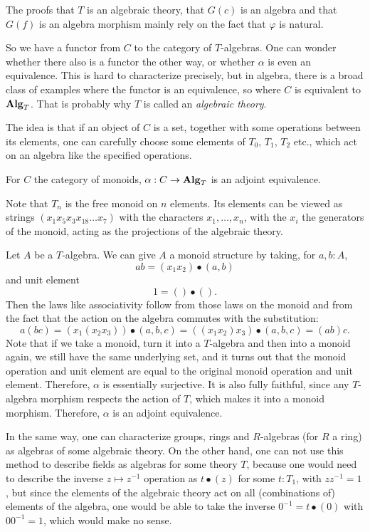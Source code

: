 The proofs that $ T $ is an algebraic theory, that $ G(c) $ is an algebra and that $ G(f) $ is an algebra morphism mainly rely on the fact that $ \varphi $ is natural.

So we have a functor from $ C $ to the category of $ T $-algebras. One can wonder whether there also is a functor the other way, or whether $ \alpha $ is even an equivalence. This is hard to characterize precisely, but in algebra, there is a broad class of examples where the functor is an equivalence, so where $ C $ is equivalent to $ \mathbf{Alg}_{T} $. That is probably why $ T $ is called an \textit{algebraic theory}.

The idea is that if an object of $ C $ is a set, together with some operations between its elements, one can carefully choose some elements of $ T_0 $, $ T_1 $, $ T_2 $ etc., which act on an algebra like the specified operations.

\begin{example}\label{ex:free-monoid-theory}
  For $ C $ the category of monoids, $ \alpha: C \to \mathbf{Alg}_{T} $ is an adjoint equivalence.

  Note that $ T_n $ is the free monoid on $ n $ elements. Its elements can be viewed as strings $ (x_1 x_5 x_3 x_{18} \dots x_7) $ with the characters $ x_1, \dots, x_n $, with the $ x_i $ the generators of the monoid, acting as the projections of the algebraic theory.

  Let $ A $ be a $ T $-algebra. We can give $ A $ a monoid structure by taking, for $ a, b: A $,
  \[ a b = (x_1 x_2) \bullet (a, b) \]
  and unit element
  \[ 1 = () \bullet (). \]
  Then the laws like associativity follow from those laws on the monoid and from the fact that the action on the algebra commutes with the substitution:
  \[ a (b c) = (x_1 (x_2 x_3)) \bullet (a, b, c) = ((x_1 x_2) x_3) \bullet (a, b, c) = (a b) c. \]
  Note that if we take a monoid, turn it into a $ T $-algebra and then into a monoid again, we still have the same underlying set, and it turns out that the monoid operation and unit element are equal to the original monoid operation and unit element. Therefore, $ \alpha $ is essentially surjective. It is also fully faithful, since any $ T $-algebra morphism respects the action of $ T $, which makes it into a monoid morphism. Therefore, $ \alpha $ is an adjoint equivalence.
\end{example}

\begin{remark}
  In the same way, one can characterize groups, rings and $ R $-algebras (for $ R $ a ring) as algebras of some algebraic theory. On the other hand, one can not use this method to describe fields as algebras for some theory $ T $, because one would need to describe the inverse $ z \mapsto z^{-1} $ operation as $ t \bullet (z) $ for some $ t: T_1 $, with $ z z^{-1} = 1 $, but since the elements of the algebraic theory act on all (combinations of) elements of the algebra, one would be able to take the inverse $ 0^{-1} = t \bullet (0) $ with $ 0 0^{-1} = 1 $, which would make no sense.
\end{remark}

